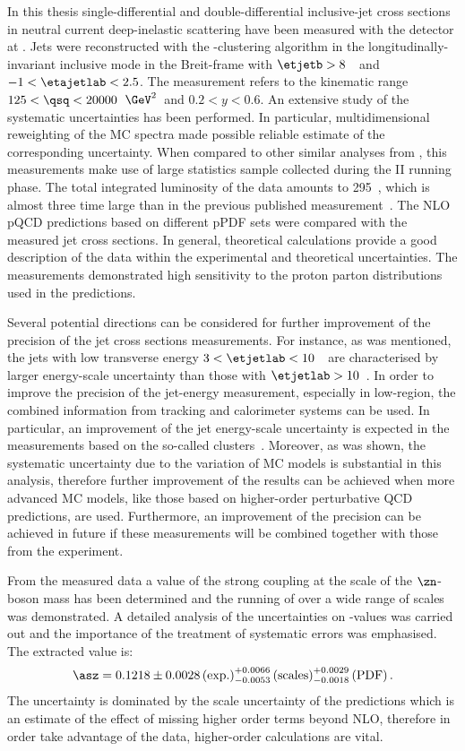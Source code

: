 In this thesis single-differential and double-differential inclusive-jet cross sections in neutral current deep-inelastic scattering have been measured with the \zeus detector at \hera. Jets were reconstructed with the \kt-clustering algorithm in the longitudinally-invariant inclusive mode in the Breit-frame with $\etjetb > 8$~\GeV~and $-1<\etajetlab<2.5$. The measurement refers to the kinematic range $125 < \qsq < 20000$~$\GeV^2$~and $0.2<y<0.6$. An extensive study of the systematic uncertainties has been performed. In particular, multidimensional re\-weight\-ing of the MC spectra made possible reliable estimate of the corresponding uncertainty. When compared to other similar analyses from \zeus, this measurements make use of large statistics sample collected during the \hera II running phase. The total integrated luminosity of the data amounts to 295~\invpb, which is almost three time large than in the previous published measurement~\cite{Abramowicz:2010ke}. The NLO pQCD predictions based on different pPDF sets were compared with the measured jet cross sections. In general, theoretical calculations provide a good description of the data within the experimental and theoretical uncertainties. The measurements demonstrated high sensitivity to the proton parton distributions used in the predictions.

Several potential directions can be considered for further improvement of the precision of the jet cross sections measurements. For instance, as was mentioned, the jets with low transverse energy $3 < \etjetlab < 10$~\GeV~are characterised by larger energy-scale uncertainty than those with $\etjetlab > 10$~\GeV. In order to improve the precision of the jet-energy measurement, especially in low-\etjetlab region, the combined information from tracking and calorimeter systems can be used. In particular, an improvement of the jet energy-scale uncertainty is expected in the measurements based on the so-called \zufos clusters~\cite{upub:Tuning:zn01021}. Moreover, as was shown, the systematic uncertainty due to the variation of MC models is substantial in this analysis, therefore further improvement of the results can be achieved when more advanced MC models, like those based on higher-order perturbative QCD predictions, are used.%
Furthermore, an improvement of the precision can be achieved in future if these measurements will be combined together with those from the \hone experiment.

From the measured data a value of the strong coupling at the scale of the $\zn$-boson mass has been determined and the running of \as over a wide range of scales was demonstrated. A detailed analysis of the uncertainties on \asz-values was carried out and the importance of the treatment of systematic errors was emphasised. The extracted \asz value is:
\begin{equation}
 \asz = 0.1218 \pm 0.0028\left(\text{exp.}\right)^{+0.0066}_{-0.0053}\left(\text{scales}\right)^{+0.0029}_{-0.0018}\left(\text{PDF}\right).
\end{equation}
The uncertainty is dominated by the scale uncertainty of the predictions which is an estimate of the effect of missing higher order terms beyond NLO, therefore in order take advantage of the data, higher-order calculations are vital. 

